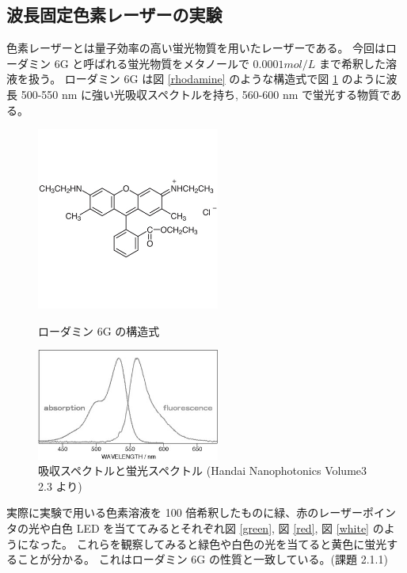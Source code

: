 \documentclass[uplatex,dvipdfmx,a4paper,11pt]{jlreq}
\numberwithin{equation}{section}
\theoremstyle{definition}
\begin{document}
\subsection{波長固定色素レーザーの実験}

色素レーザーとは量子効率の高い蛍光物質を用いたレーザーである。
今回はローダミン 6G と呼ばれる蛍光物質をメタノールで $0.0001\si{mol/L}$ まで希釈した溶液を扱う。
ローダミン 6G は図 \ref{rhodamine} のような構造式で図 \ref{rhodamine_spectrum} のように波長 500-550 \si{nm} に強い光吸収スペクトルを持ち, 560-600 \si{nm} で蛍光する物質である。\\

\begin{figure}[htbp]
  \begin{minipage}[b]{0.5\linewidth}
    \centering
    \includegraphics[width=6cm]{./assets/rhodamine6G.jpg}
    \caption{ローダミン 6G の構造式}
    \label{rhodamine}
  \end{minipage}
  \begin{minipage}[b]{0.5\linewidth}
    \centering
    \includegraphics[width=6cm]{./assets/rhodamine6G_wave.jpg}
    \caption{吸収スペクトルと蛍光スペクトル (Handai Nanophotonics Volume3 2.3 より)}
    \label{rhodamine_spectrum}
  \end{minipage}
\end{figure}

実際に実験で用いる色素溶液を 100 倍希釈したものに緑、赤のレーザーポインタの光や白色 LED を当ててみるとそれぞれ図 \ref{green}, 図 \ref{red}, 図 \ref{white} のようになった。
これらを観察してみると緑色や白色の光を当てると黄色に蛍光することが分かる。
これはローダミン 6G の性質と一致している。(課題 2.1.1) \\
\end{document}
